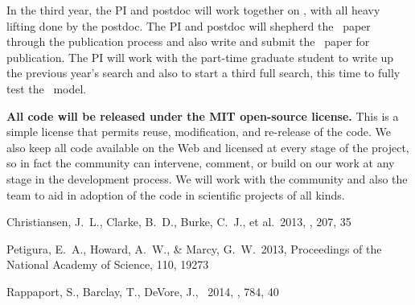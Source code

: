\documentclass[letterpaper,12pt,preprint]{hack_aastex}
\begin{document}
In the third year, the PI and postdoc will work together on \kpsf, with all
heavy lifting done by the postdoc.
The PI and postdoc will shepherd the \PLM\ paper through the publication
process and also write and submit the \kpsf\ paper for publication.
The PI will work with the part-time graduate student to write up the previous
year's search and also to start a third full search, this time to
fully test the \kpsf\ model.

\textbf{All code will be released under the MIT open-source license.}
This is a simple license that permits reuse, modification, and re-release of
the code.
We also keep all code available on the Web and licensed at every stage of
the project, so in fact the community can intervene, comment, or build on our
work at any stage in the development process.
We will work with the community and also the  team to aid in
adoption of the code in scientific projects of all kinds.

\clearpage
\begin{thebibliography}{}\raggedright%

Christiansen, J.~L., Clarke, B.~D., Burke, C.~J., et al.\ 2013, \apjs, 207, 35

Petigura, E.~A., Howard, A.~W., \& Marcy, G.~W.\ 2013,
Proceedings of the National Academy of Science, 110, 19273

Rappaport, S., Barclay, T., DeVore, J., \etal\ 2014, \apj, 784, 40

\end{thebibliography}
\end{document}
